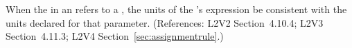 When the  in an \InitialAssignment refers to a \Parameter,
the units of the \InitialAssignment's  expression  be
consistent with the units declared for that parameter.  (References: L2V2
Section~4.10.4; L2V3 Section~4.11.3; L2V4 Section~\ref{sec:assignmentrule}.)
